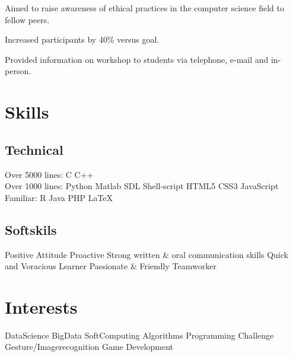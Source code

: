 \documentclass[]{sagar_resume}
\begin{document}
\begin{minipage}[t]{0.66\textwidth}
\begin{tightemize}
\item Aimed to raise awareness of ethical practices in the computer science field to fellow peers.
\item Increased participants by 40\% versus goal.
\item Provided information on workshop to students via telephone, e-mail and in-person.
\end{tightemize}
\sectionsep

\section{Skills}
\subsection{Technical}
Over 5000 lines: C \textbullet{}  C++\\
Over 1000 lines: Python \textbullet{} Matlab \textbullet{} SDL\textbullet{} Shell-script \textbullet{} HTML5 \textbullet{} CSS3 \textbullet{} JavaScript  \\
Familiar: R \textbullet{} Java \textbullet{} PHP \textbullet{} \LaTeX\\
\sectionsep
\subsection{Softskils}
Positive Attitude
\textbullet{}Proactive
\textbullet{}Strong written \& oral communication skills
\textbullet{}Quick and Voracious Learner
\textbullet{}Passionate \& Friendly
\textbullet{}Teamworker
\sectionsep

\section{Interests}
DataScience
\textbullet{}BigData
\textbullet{}SoftComputing
\textbullet{}Algorithms
\textbullet{}Programming Challenge
\textbullet{}Gesture/Imagerecognition
\textbullet{}Game Development



\end{minipage}
\end{document}
